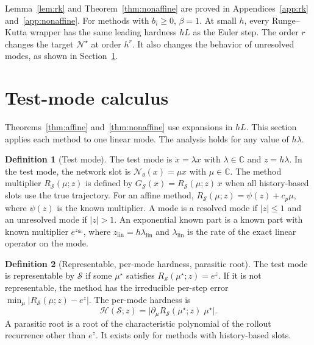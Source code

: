 \documentclass[11pt]{article}
\theoremstyle{definition}
\newtheorem{definition}{Definition}
\theoremstyle{remark}
\newcommand{\C}{\mathbb{C}}
\newcommand{\Net}{\mathcal{N}_\theta}    %
\newcommand{\Netstar}{\mathcal{N}^\star} %
\newcommand{\Meth}{\mathcal{S}}          %
\newcommand{\Hard}{\mathcal{H}}          %
\begin{document}
Lemma~\ref{lem:rk} and Theorem~\ref{thm:nonaffine} are proved in Appendices~\ref{app:rk} and~\ref{app:nonaffine}.
For methods with $b_i \ge 0$, $\beta = 1$.
At small $h$, every Runge--Kutta wrapper has the same leading hardness $hL$ as the Euler step.
The order $r$ changes the target $\Netstar$ at order $h^r$.
It also changes the behavior of unresolved modes, as shown in Section~\ref{sec:testmode}.

\section{Test-mode calculus}\label{sec:testmode}

Theorems~\ref{thm:affine} and~\ref{thm:nonaffine} use expansions in $hL$.
This section applies each method to one linear mode.
The analysis holds for any value of $h\lambda$.

\begin{definition}[Test mode]\label{def:testmode}
The test mode is $\dot x = \lambda x$ with $\lambda \in \C$ and $z = h\lambda$.
In the test mode, the network slot is $\Net(x) = \mu x$ with $\mu \in \C$.
The method multiplier $R_\Meth(\mu; z)$ is defined by $G_\Meth(x) = R_\Meth(\mu; z)\, x$ when all history-based slots use the true trajectory.
For an affine method, $R_\Meth(\mu;z) = \psi(z) + c_p \mu$, where $\psi(z)$ is the known multiplier.
A mode is a resolved mode if $|z| \le 1$ and an unresolved mode if $|z| > 1$.
An exponential known part is a known part with known multiplier $e^{z_{\mathrm{lin}}}$, where $z_{\mathrm{lin}} = h\lambda_{\mathrm{lin}}$ and $\lambda_{\mathrm{lin}}$ is the rate of the exact linear operator on the mode.
\end{definition}

\begin{definition}[Representable, per-mode hardness, parasitic root]\label{def:permode}
The test mode is representable by $\Meth$ if some $\mu^\star$ satisfies $R_\Meth(\mu^\star; z) = e^z$.
If it is not representable, the method has the irreducible per-step error $\min_\mu |R_\Meth(\mu; z) - e^z|$.
The per-mode hardness is
\begin{equation}\label{eq:permode}
\Hard(\Meth; z) = \big|\partial_\mu R_\Meth(\mu^\star; z)\; \mu^\star\big|.
\end{equation}
A parasitic root is a root of the characteristic polynomial of the rollout recurrence other than $e^z$.
It exists only for methods with history-based slots.
\end{definition}
\end{document}

